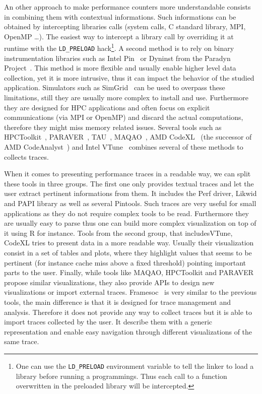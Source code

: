 An other approach to make performance counters more understandable consists in combining them with contextual informations.
Such informations can be obtained by intercepting libraries calls (system calls, C standard library, \gls{MPI}, \gls{OpenMP} \ldots).
The easiest way to intercept a library call by overriding it at runtime with the \texttt{LD\_PRELOAD} hack\footnote{
    One can use the \texttt{LD\_PRELOAD} environment variable to tell the linker to load a library before running a programmings.
    Thus each call to a function overwritten in the preloaded library will be intercepted.}.
A second method is to rely on binary instrumentation libraries such as \gls{Intel} \gls{Pin}~\cite{Luk05Pin} or Dyninst from the Paradyn Project~\cite{Miller95Paradyn}.
This method is more flexible and usually enable higher level data collection, yet it is more intrusive, thus it can impact the behavior of the studied application.
Simulators such as \gls{SimGrid}~\cite{Casanova14Versatile} can be used to overpass these limitations, still they are usually more complex to install and use.
Furthermore they are designed for \gls{HPC} applications and often focus on explicit communications (via \gls{MPI} or \gls{OpenMP}) and discard the actual computations, therefore they might miss memory related issues.
Several tools such as \gls{HPCToolkit}~\cite{Adhianto10HPCTOOLKIT}, \gls{PARAVER}~\cite{Pillet95PARAVER}, \gls{TAU}~\cite{Shende06Tau}, \gls{MAQAO}~\cite{Djoudi05MAQAO}, \gls{AMD} \gls{CodeXL}~\cite{AMD16CodeXL} (the successor of \gls{AMD} \gls{CodeAnalyst}~\cite{Drongowski08introduction}) and \gls{Intel} \gls{VTune}~\cite{Reinders05VTune} combines several of these methods to collects traces.

When it comes to presenting performance traces in a readable way, we can split these tools in three groups.
The first one only provides textual traces and let the user extract pertinent informations from them.
It includes the \gls{Perf} driver, \gls{Likwid} and \gls{PAPI} library as well as several \glspl{Pintool}.
Such traces are very useful for small applications as they do not require complex tools to be read.
Furthermore they are usually easy to parse thus one can build more complex visualization on top of it using \gls{R} for instance.
Tools from the second group, that includes\gls{VTune}, \gls{CodeXL} tries to present data in a more readable way.
Usually their visualization consist in a set of tables and plots, where they highlight values that seems to be pertinent (for instance cache miss above a fixed threshold) pointing important parts to the user.
Finally, while tools like \gls{MAQAO}, \gls{HPCToolkit} and \gls{PARAVER} propose similar visualizations, they also provide \glspl{API} to design new visualizations or import external traces.
\gls{Framesoc}~\cite{Pagano13Trace} is very similar to the previous tools, the main difference is that it is designed for trace management and analysis.
Therefore it does not provide any way to collect traces but it is able to import traces collected by the user.
It describe them with a generic representation and enable easy navigation through different visualizations of the same trace.

